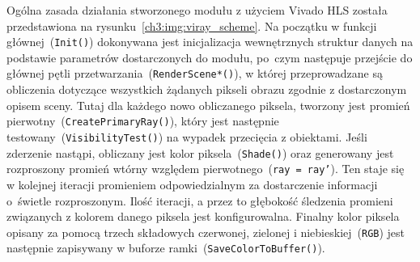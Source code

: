 
Ogólna zasada działania stworzonego modułu z użyciem Vivado HLS została przedstawiona na rysunku~\ref{ch3:img:viray_scheme}. Na początku w funkcji głównej~(\texttt{Init()}) dokonywana jest inicjalizacja wewnętrznych struktur danych na podstawie parametrów dostarczonych do modułu, po~czym następuje przejście do głównej pętli przetwarzania~(\texttt{RenderScene*()}), w której przeprowadzane są obliczenia dotyczące wszystkich żądanych pikseli obrazu zgodnie z dostarczonym opisem sceny. Tutaj dla każdego nowo obliczanego piksela, tworzony jest promień pierwotny~(\texttt{CreatePrimaryRay()}), który jest następnie testowany~(\texttt{VisibilityTest()}) na wypadek przecięcia z obiektami. Jeśli zderzenie nastąpi, obliczany jest kolor piksela~(\texttt{Shade()}) oraz generowany jest rozproszony promień wtórny względem pierwotnego~(\texttt{ray = ray'}). Ten staje się w kolejnej iteracji promieniem odpowiedzialnym za dostarczenie informacji o~świetle rozproszonym. Ilość iteracji, a przez to głębokość śledzenia promieni związanych z kolorem danego piksela jest konfigurowalna. Finalny kolor piksela opisany za pomocą trzech składowych czerwonej, zielonej i niebieskiej~(\texttt{RGB}) jest następnie zapisywany w buforze ramki~(\texttt{SaveColorToBuffer()}).

